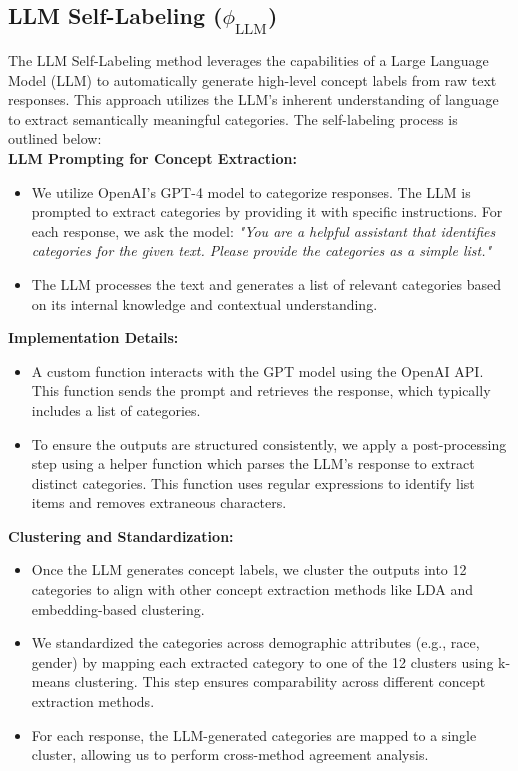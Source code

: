\documentclass{article}
\begin{document}
\subsection{LLM Self-Labeling ($\phi_{\text{LLM}}$)}
The LLM Self-Labeling method leverages the capabilities of a Large Language Model (LLM) to automatically generate high-level concept labels from raw text responses. This approach utilizes the LLM's inherent understanding of language to extract semantically meaningful categories. The self-labeling process is outlined below:\\

\textbf{LLM Prompting for Concept Extraction:}
\begin{itemize}
    \item We utilize OpenAI's GPT-4 model to categorize responses. The LLM is prompted to extract categories by providing it with specific instructions. For each response, we ask the model: \textit{"You are a helpful assistant that identifies categories for the given text. Please provide the categories as a simple list."}
    \item The LLM processes the text and generates a list of relevant categories based on its internal knowledge and contextual understanding.\\
\end{itemize}

\textbf{Implementation Details:}
\begin{itemize}
    \item A custom function interacts with the GPT model using the OpenAI API. This function sends the prompt and retrieves the response, which typically includes a list of categories.
    \item To ensure the outputs are structured consistently, we apply a post-processing step using a helper function which parses the LLM’s response to extract distinct categories. This function uses regular expressions to identify list items and removes extraneous characters.\\
\end{itemize}

\textbf{Clustering and Standardization:}
\begin{itemize}
    \item Once the LLM generates concept labels, we cluster the outputs into 12 categories to align with other concept extraction methods like LDA and embedding-based clustering.
    \item We standardized the categories across demographic attributes (e.g., race, gender) by mapping each extracted category to one of the 12 clusters using k-means clustering. This step ensures comparability across different concept extraction methods.
    \item For each response, the LLM-generated categories are mapped to a single cluster, allowing us to perform cross-method agreement analysis.\\
\end{itemize}
\end{document}
